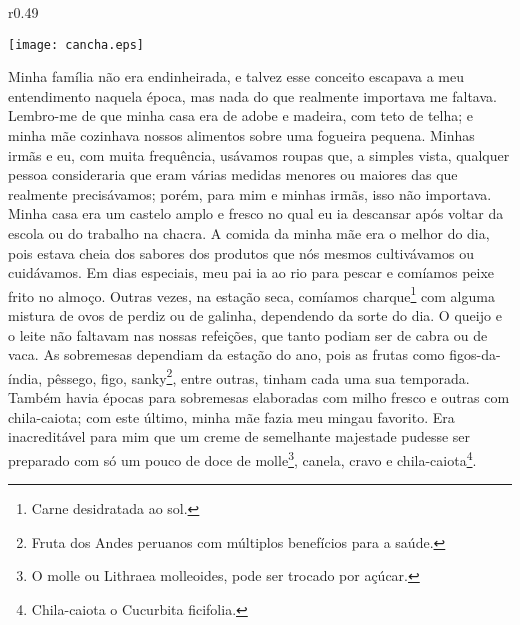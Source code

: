 \ifdefined\EnableIncludeImages
\begin{wrapfigure}{r}{0.49\textwidth}
  \begin{center}
  \vspace{-20pt}
    \texttt{[image: cancha.eps]}
  \end{center}
  \vspace{-20pt}
\end{wrapfigure}
\fi
Minha família não era endinheirada, e talvez esse conceito escapava a meu entendimento naquela época, mas nada do que realmente importava me faltava.
Lembro-me de que minha casa era de adobe e madeira, com teto de telha; e minha mãe cozinhava nossos alimentos sobre uma fogueira pequena. Minhas irmãs e eu, com muita frequência, usávamos roupas que, a simples vista, qualquer pessoa consideraria que eram várias medidas menores ou maiores das que realmente precisávamos;
porém, para mim e minhas irmãs, isso não importava. Minha casa era um castelo amplo e fresco no qual eu ia descansar após voltar da escola ou do trabalho na chacra. 
A comida da minha mãe era o melhor do dia, pois estava cheia dos sabores dos produtos que nós mesmos cultivávamos ou cuidávamos. 
Em dias especiais, meu pai ia ao rio para pescar e comíamos peixe frito no almoço. Outras vezes, na estação seca, comíamos charque\footnote{Carne desidratada ao sol.} com alguma mistura de ovos de perdiz ou de galinha, dependendo da sorte do dia.
O queijo e o leite não faltavam nas nossas refeições, que tanto podiam ser de cabra ou de vaca.
As sobremesas dependiam da estação do ano, pois as frutas como figos-da-índia, pêssego, figo, sanky\footnote{Fruta dos Andes peruanos com múltiplos benefícios para a saúde.}, entre outras, tinham cada uma sua temporada. Também havia épocas para sobremesas elaboradas com milho fresco e outras com chila-caiota; com este último, minha mãe fazia meu mingau favorito. Era inacreditável para mim que um creme de semelhante majestade pudesse ser preparado com só um pouco de doce de molle\footnote{O molle ou Lithraea molleoides, pode ser trocado por açúcar.}, canela, cravo e chila-caiota\footnote{Chila-caiota o Cucurbita ficifolia.}.

